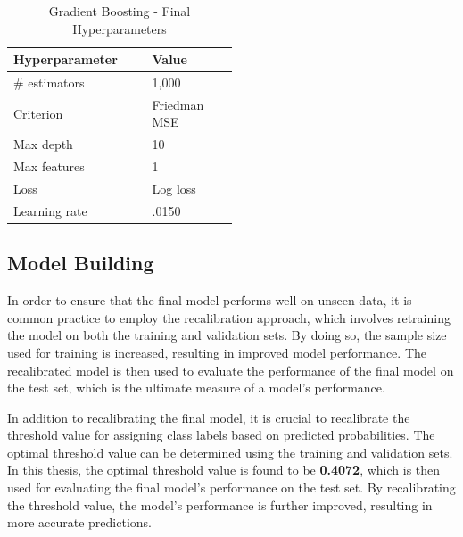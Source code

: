 \begin{table}[H]
    \small
    \setlength{\tabcolsep}{8pt}
    \renewcommand{\arraystretch}{1.3}
    \centering
        \caption[Gradient Boosting - Final Hyperparameters]{Gradient Boosting - Final Hyperparameters}\label{tab:finalhyp}
        \begin{tabular}{p{0.25\linewidth}p{0.25\linewidth}}
    \toprule
    \textbf{Hyperparameter} & \textbf{Value}\\
    \midrule
    \hline
    \# estimators & 1,000 \\
    Criterion & Friedman MSE \\
    Max depth & 10 \\
    Max features & 1 \\
    Loss & Log loss \\
    Learning rate &  .0150 \\
    \hline
    \bottomrule
    \end{tabular}
    \vspace{0.7em}

    \vspace{-1em}
\end{table}

\subsection{Model Building}

In order to ensure that the final model performs well on unseen data, it is common practice to employ the recalibration approach, which involves retraining the model on both the training and validation sets.
By doing so, the sample size used for training is increased, resulting in improved model performance.
The recalibrated model is then used to evaluate the performance of the final model on the test set, which is the ultimate measure of a model's performance.

In addition to recalibrating the final model, it is crucial to recalibrate the threshold value for assigning class labels based on predicted probabilities. The optimal threshold value can be determined using the training and validation sets.
In this thesis, the optimal threshold value is found to be \textbf{0.4072}, which is then used for evaluating the final model's performance on the test set.
By recalibrating the threshold value, the model's performance is further improved, resulting in more accurate predictions.

